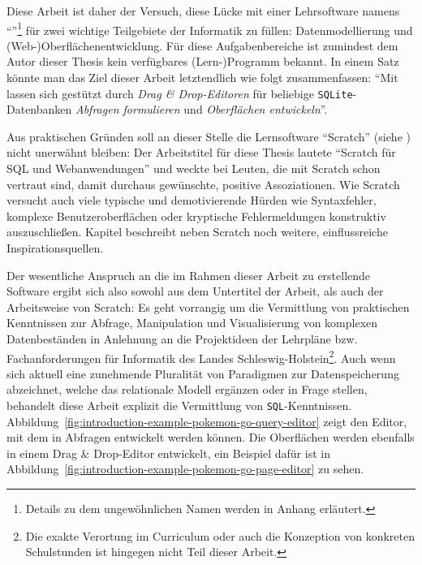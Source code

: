 Diese Arbeit ist daher der Versuch, diese Lücke mit einer Lehrsoftware namens "`\idename{}"'\footnote{Details zu dem ungewöhnlichen Namen werden in Anhang  erläutert.} für zwei wichtige Teilgebiete der Informatik zu füllen: Datenmodellierung und (Web-)Ober\-flächen\-ent\-wick\-lung. Für diese Aufgabenbereiche ist zumindest dem Autor dieser Thesis kein verfügbares (Lern-)Programm bekannt. In einem Satz könnte man das Ziel dieser Arbeit letztendlich wie folgt zusammenfassen: "`Mit \idename{} lassen sich gestützt durch \textit{Drag \& Drop-Editoren} für beliebige \texttt{SQLite}-Datenbanken \textit{Abfragen formulieren} und \textit{Oberflächen entwickeln}"'.


Aus praktischen Gründen soll an dieser Stelle die Lernsoftware "`Scratch"' (siehe ) nicht unerwähnt bleiben: Der Arbeitstitel für diese Thesis lautete "`Scratch für SQL und Webanwendungen"' und weckte bei Leuten, die mit Scratch schon vertraut sind, damit durchaus gewünschte, positive Assoziationen. Wie Scratch versucht auch \idename{} viele typische und demotivierende Hürden wie Syntaxfehler, komplexe Benutzeroberflächen oder kryptische Fehlermeldungen konstruktiv auszuschließen. Kapitel  beschreibt neben Scratch noch weitere, einflussreiche Inspirationsquellen.

Der wesentliche Anspruch an die im Rahmen dieser Arbeit zu erstellende Software ergibt sich also sowohl aus dem Untertitel der Arbeit, als auch der Arbeitsweise von Scratch: Es geht vorrangig um die Vermittlung von praktischen Kenntnissen zur Abfrage, Manipulation und Visualisierung von komplexen Datenbeständen in Anlehnung an die Projektideen der Lehrpläne \cite{lehrplan-inf-sek-1} bzw. Fachanforderungen \cite{lehrplan-inf-sek-2} für Informatik des Landes Schleswig-Holstein\footnote{Die exakte Verortung im Curriculum oder auch die Konzeption von konkreten Schulstunden ist hingegen nicht Teil dieser Arbeit.}. Auch wenn sich aktuell eine zunehmende Pluralität von Paradigmen zur Datenspeicherung abzeichnet, welche das relationale Modell ergänzen oder in Frage stellen, behandelt diese Arbeit explizit die Vermittlung von \texttt{SQL}-Kenntnissen. Abbildung~\ref{fig:introduction-example-pokemon-go-query-editor} zeigt den Editor, mit dem in \idename{} Abfragen entwickelt werden können. Die Oberflächen werden ebenfalls in einem Drag \& Drop-Editor entwickelt, ein Beispiel dafür ist in Abbildung~\ref{fig:introduction-example-pokemon-go-page-editor} zu sehen.

